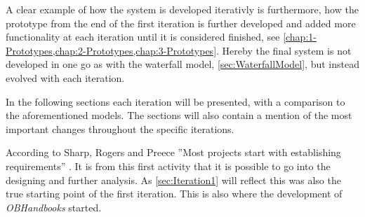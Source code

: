 A clear example of how the system is developed iterativly is furthermore, how the prototype from the end of the first iteration is further developed and added more functionality at each iteration until it is considered finished, see \cref{chap:1-Prototypes,chap:2-Prototypes,chap:3-Prototypes}.
Hereby the final system is not developed in one go as with the waterfall model, \cref{sec:WaterfallModel},  but instead evolved with each iteration.

In the following sections each iteration will be presented, with a comparison to the aforementioned models.
The sections will also contain a mention of the most important changes throughout the specific iterations.

According to Sharp, Rogers and Preece ''Most projects start with establishing requirements'' \citep[p.~333]{InteractionDesign}.
It is from this first activity that it is possible to go into the designing and further analysis.
As \cref{sec:Iteration1} will reflect this was also the true starting point of the first iteration.
This is also where the development of \textit{OBHandbooks} started.
